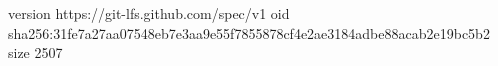 version https://git-lfs.github.com/spec/v1
oid sha256:31fe7a27aa07548eb7e3aa9e55f7855878cf4e2ae3184adbe88acab2e19bc5b2
size 2507
